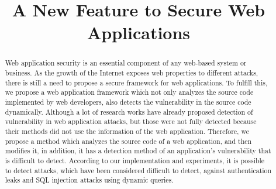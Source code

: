 \documentclass[conference]{IEEEtran}
\begin{document}
\title{A New Feature to Secure Web Applications}

\author{
\and
{}
\and
{}
}

\maketitle

\begin{abstract}
Web application security is an essential component of any web-based system or business.
As the growth of the Internet exposes web properties to different attacks, there is still a need to propose a secure framework for web applications.
To fulfill this, we propose a web application framework which not only analyzes the source code implemented by web developers, also detects the vulnerability in the source code dynamically.
Although a lot of research works have already proposed detection of vulnerability in web application attacks, but those were not fully detected because their methods did not use the information of the web application. Therefore, we propose a method which analyzes the source code of a web application, and then modifies it, in addition, it has a detection method of an application’s vulnerability that is difficult to detect.
According to our implementation and experiments, it is possible to detect attacks, which have been considered difficult to detect, against authentication leaks and SQL injection attacks using dynamic queries.
\end{abstract}
\end{document}
